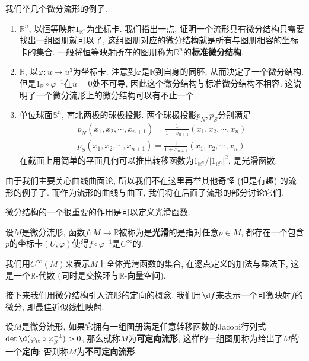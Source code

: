 \begin{eg}我们举几个微分流形的例子.
    \begin{enumerate}[(1)]
        \item $\mathbb{R}^n$, 以恒等映射$1_{\mathbb{R}^n}$为坐标卡.
        我们指出一点, 证明一个流形具有微分结构只需要找出一组图册就可以了, 这组图册对应的微分结构就是所有与图册相容的坐标卡的集合.
        一般将恒等映射所在的图册称为$\mathbb{R}^n$的\textbf{标准微分结构}.
        \item $\mathbb{R}$, 以$\varphi:u\mapsto u^3$为坐标卡.
        注意到$\varphi$是$\mathbb{R}$到自身的同胚, 从而决定了一个微分结构.
        但是$1_{\mathbb{R}}\circ\varphi^{-1}$在$u=0$处不可导, 因此这个微分结构与标准微分结构不相容.
        这说明了一个微分流形上的微分结构可以有不止一个.
        \item 单位球面$\mathbb{S}^n$, 南北两极的球极投影. 两个球极投影$p_N,p_S$分别满足
        \begin{gather*}
            p_N(x_1,x_2,\cdots,x_{n+1})=\frac{1}{1-x_{n+1}}(x_1,x_2,\cdots,x_n)\\
            p_S(x_1,x_2,\cdots,x_{n+1})=\frac{1}{1+x_{n+1}}(x_1,x_2,\cdots,x_n)
        \end{gather*}
        在截面上用简单的平面几何可以推出转移函数为$1_{\mathbb{R}^n}/|1_{\mathbb{R}^n}|^2$, 是光滑函数.
    \end{enumerate}
\end{eg}
由于我们主要关心曲线曲面论, 所以我们不在这里再举其他奇怪 (但是有趣) 的流形的例子了.
而作为流形的曲线与曲面, 我们将在后面子流形的部分讨论它们.

微分结构的一个很重要的作用是可以定义光滑函数.
\begin{defn}\label{smooth function 1}
    设$M$是微分流形, 函数$f:M\to\mathbb{R}$被称为是\textbf{光滑}的是指对任意$p\in M$, 都存在一个包含$p$的坐标卡$(U,\varphi)$使得$f\circ\varphi^{-1}$是$C^\infty$的.
\end{defn}

\begin{sym}
    我们用$C^\infty(M)$来表示$M$上全体光滑函数的集合, 在逐点定义的加法与乘法下, 这是一个$\mathbb{R}$-代数 (同时是交换环与$\mathbb{R}$-向量空间).
\end{sym}

接下来我们用微分结构引入流形的定向的概念.
我们用$\d f$来表示一个可微映射$f$的微分, 即最佳近似线性映射.
\begin{defn}
    设$M$是微分流形, 如果它拥有一组图册满足任意转移函数的Jacobi行列式$\det\d(\varphi_\alpha\circ\varphi_\beta^{-1})>0$, 那么就称$M$为\textbf{可定向流形}, 这样的一组图册称为给出了$M$的一个\textbf{定向}; 否则称$M$为\textbf{不可定向流形}.
\end{defn}

